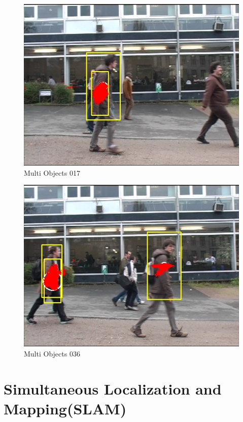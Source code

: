 \documentclass[10pt, conference, compsocconf]{IEEEtran}
\begin{document}
\begin{figure}[H]
	\centering
	\includegraphics[scale = 0.30]{image/p4/000017.jpg}
	\caption{Multi Objects 017}
	\label{fig:multi017}
\end{figure}

\begin{figure}[H]
	\centering
	\includegraphics[scale = 0.30]{image/p4/000036.jpg}
	\caption{Multi Objects 036}
	\label{fig:multi036}
\end{figure}

\section{Simultaneous Localization and Mapping(SLAM)}
\end{document}
